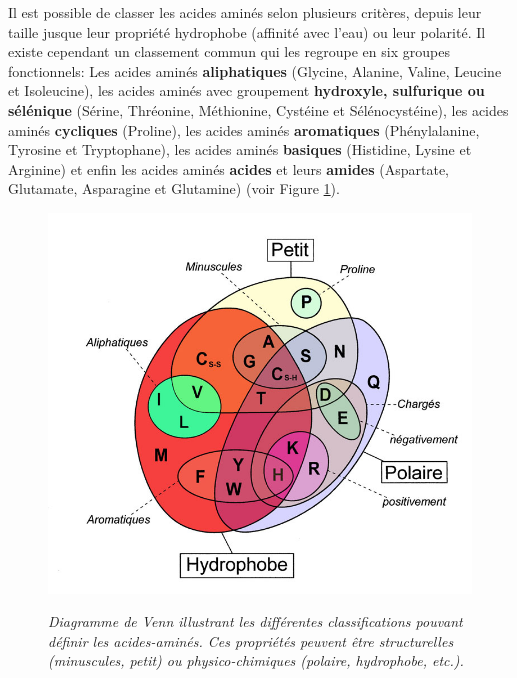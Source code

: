 

Il est possible de classer les acides aminés selon plusieurs critères, depuis leur taille jusque leur propriété hydrophobe (affinité avec l'eau) ou leur polarité. Il existe cependant un classement commun qui les regroupe en six groupes fonctionnels: Les acides aminés \textbf{aliphatiques} (Glycine, Alanine, Valine, Leucine et Isoleucine), les acides aminés avec groupement \textbf{hydroxyle, sulfurique ou sélénique} (Sérine, Thréonine, Méthionine, Cystéine et Sélénocystéine), les acides aminés \textbf{cycliques} (Proline), les acides aminés \textbf{aromatiques} (Phénylalanine, Tyrosine et Tryptophane), les acides aminés \textbf{basiques} (Histidine, Lysine et Arginine) et enfin les acides aminés \textbf{acides} et leurs \textbf{amides} (Aspartate, Glutamate, Asparagine et Glutamine) (voir Figure \ref{Fig:diagramme_venn}).

\begin{figure}
  \centering
  {\includegraphics[width=0.75\linewidth]{./figures/ch1/diagramme_venn}}
    \caption{\it Diagramme de Venn illustrant les différentes classifications pouvant définir les acides-aminés. Ces propriétés peuvent être structurelles (minuscules, petit) ou physico-chimiques (polaire, hydrophobe, etc.).}
    \label{Fig:diagramme_venn}
  \hspace{0.2cm}
\end{figure}


